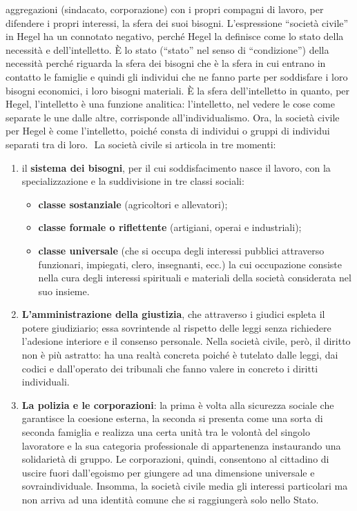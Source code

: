 \documentclass[a4paper,12pt,oneside,openany]{book}%
\begin{document}
aggregazioni (sindacato, corporazione) con i propri compagni di lavoro, per difendere i propri interessi, la sfera dei suoi bisogni. L’espressione “società civile” in Hegel ha un connotato negativo, perché Hegel la definisce come lo stato della necessità e dell’intelletto. È lo stato (“stato” nel senso di “condizione”) della necessità perché riguarda la sfera dei bisogni che è la sfera in cui entrano in contatto le famiglie e quindi gli individui che ne fanno parte per soddisfare i loro bisogni economici, i loro bisogni materiali. È la sfera dell’intelletto in quanto, per Hegel, l’intelletto è una funzione analitica: l’intelletto, nel vedere le cose come separate le une dalle altre, corrisponde all’individualismo. Ora, la società civile per Hegel è come l’intelletto, poiché consta di individui o gruppi di individui separati tra di loro.  La società civile si articola in tre momenti:

\begin{enumerate}
	\item il \textbf{sistema dei bisogni}, per il cui soddisfacimento nasce il lavoro, con la specializzazione e la suddivisione in tre classi sociali:
	\begin{itemize}
		\item \textbf{classe sostanziale} (agricoltori e allevatori);
		\item \textbf{classe formale o riflettente} (artigiani, operai e industriali);
		\item \textbf{classe universale} (che si occupa degli interessi pubblici attraverso funzionari, impiegati, clero, insegnanti, ecc.) la cui occupazione consiste nella cura degli interessi spirituali e materiali della società considerata nel suo insieme.
	\end{itemize}
	\item \textbf{L’amministrazione della giustizia}, che attraverso i giudici espleta il potere giudiziario; essa sovrintende al rispetto delle leggi senza richiedere l’adesione interiore e il consenso personale. Nella società civile, però, il diritto non è più astratto: ha una realtà concreta poiché è tutelato dalle leggi, dai codici e dall’operato dei tribunali che fanno valere in concreto i diritti individuali.
	\item \textbf{La polizia e le corporazioni}: la prima è volta alla sicurezza sociale che garantisce la coesione esterna, la seconda si presenta come una sorta di seconda famiglia e realizza una certa unità tra le volontà del singolo lavoratore e la sua categoria professionale di appartenenza instaurando una solidarietà di gruppo. Le corporazioni, quindi, consentono al cittadino di uscire fuori dall’egoismo per giungere ad una dimensione universale e sovraindividuale. Insomma, la società civile media gli interessi particolari ma non arriva ad una identità comune che si raggiungerà solo nello Stato.
\end{enumerate}
\end{document}
